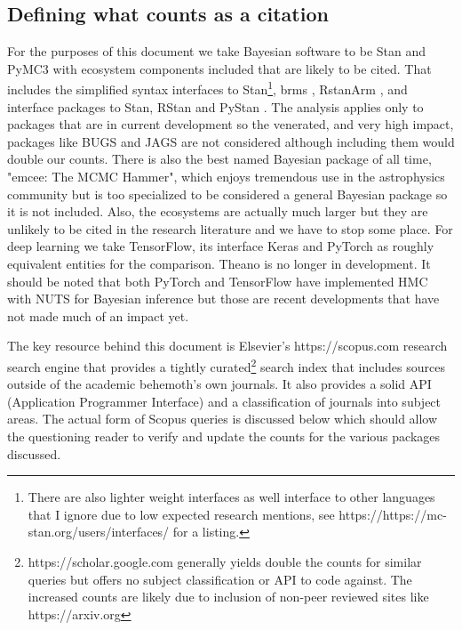 \documentclass[AMA,STIX1COL]{WileyNJD-v2}
\begin{document}
\subsection{Defining what counts as a citation}

For the purposes of this document we take Bayesian software to be Stan \cite{standev} and PyMC3 \cite{salvatier2016probabilistic} with ecosystem components included that are likely to be cited. That includes the simplified syntax interfaces to Stan\footnote{\label{three}There are also lighter weight interfaces as well interface to other languages that I ignore due to low expected research mentions, see https://https://mc-stan.org/users/interfaces/ for a listing.}, brms \cite{brms}, RstanArm \cite{rstanarm}, and interface packages to Stan, RStan \cite{rstan} and PyStan \cite{pystan}. The analysis applies only to packages that are in current development so the venerated, and very high impact, packages like BUGS \cite{lunn2013bugs} and JAGS \cite{plummer2003jags} are not considered although including them would double our counts. There is also the best named Bayesian package of all time, "emcee: The MCMC Hammer", \cite{foreman2013emcee} which enjoys tremendous use in the astrophysics community but is too specialized to be considered a general Bayesian package so it is not included. Also, the ecosystems are actually much larger but they are unlikely to be cited in the research literature and we have to stop some place. For deep learning we take TensorFlow, its interface Keras \cite{keras} and PyTorch \cite{pytorch} as roughly equivalent entities for the comparison. Theano \cite{theano} is no longer in development. It should be noted that both PyTorch and TensorFlow have implemented HMC with NUTS for Bayesian inference but those are recent developments that have not made much of an impact yet. 

The key resource behind this document is Elsevier's https://scopus.com research search engine that provides a tightly curated\footnote{\label{four}https://scholar.google.com generally yields double the counts for similar queries but offers no subject classification or API to code against. The increased counts are likely due to inclusion of non-peer reviewed sites like https://arxiv.org} search index that includes sources outside of the academic behemoth's own journals. It also provides a solid API (Application Programmer Interface) and a classification of journals into subject areas. The actual form of Scopus queries is discussed below which should allow the questioning reader to verify and update the counts for the various packages discussed. 
\end{document}
